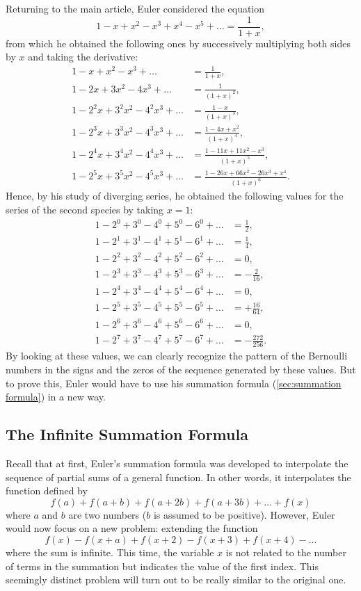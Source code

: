 Returning to the main article, Euler considered the equation
$$1 - x + x^2 - x^3 + x^4 - x^5 + \dots = \frac{1}{1+x},$$
from which he obtained the following ones by successively multiplying both sides by $x$ and taking the derivative:
\begin{align*}
    1 - x + x^2 - x^3 + \dots &= \frac{1}{1+x}, \\
    1 - 2x + 3x^2 - 4x^3 + \dots &= \frac{1}{(1+x)^2}, \\
    1 - 2^2x + 3^2x^2 - 4^2x^3 + \dots &= \frac{1-x}{(1+x)^3}, \\
    1 - 2^3x + 3^3x^2 - 4^3x^3 + \dots &= \frac{1-4x + x^2}{(1+x)^4}, \\
    1 - 2^4x + 3^4x^2 - 4^4x^3 + \dots &= \frac{1 - 11x + 11x^2 - x^3}{(1+x)^5}, \\
    1 - 2^5x + 3^5x^2 - 4^5x^3 + \dots &= \frac{1 - 26x + 66x^2 - 26x^3 + x^4}{(1+x)^6}.
\end{align*}
Hence, by his study of diverging series, he obtained the following values for the series of the second species by taking $x = 1$:
\begin{align*}
    1 - 2^0 + 3^0 - 4^0 + 5^0 - 6^0 + \dots &= \frac{1}{2}, \\
    1 - 2^1 + 3^1 - 4^1 + 5^1 - 6^1 + \dots &= \frac{1}{4}, \\
    1 - 2^2 + 3^2 - 4^2 + 5^2 - 6^2 + \dots &= 0, \\
    1 - 2^3 + 3^3 - 4^3 + 5^3 - 6^3 + \dots &= -\frac{2}{16}, \\
    1 - 2^4 + 3^4 - 4^4 + 5^4 - 6^4 + \dots &= 0, \\
    1 - 2^5 + 3^5 - 4^5 + 5^5 - 6^5 + \dots &= +\frac{16}{64}, \\
    1 - 2^6 + 3^6 - 4^6 + 5^6 - 6^6 + \dots &= 0, \\
    1 - 2^7 + 3^7 - 4^7 + 5^7 - 6^7 + \dots &= -\frac{272}{256}.
\end{align*}
By looking at these values, we can clearly recognize the pattern of the Bernoulli numbers in the signs and the zeros of the sequence generated by these values. But to prove this, Euler would have to use his summation formula (\autoref{sec:summation formula}) in a new way.

\subsection*{The Infinite Summation Formula}

Recall that at first, Euler's summation formula was developed to interpolate the sequence of partial sums of a general function. In other words, it interpolates the function defined by
$$f(a) + f(a + b) + f(a + 2b) + f(a + 3b) + \dots + f(x)$$
where $a$ and $b$ are two numbers ($b$ is assumed to be positive). However, Euler would now focus on a new problem: extending the function
$$f(x) - f(x + a) + f(x + 2) - f(x + 3) + f(x + 4) - \dots$$
where the sum is infinite. This time, the variable $x$ is not related to the number of terms in the summation but indicates the value of the first index. This seemingly distinct problem will turn out to be really similar to the original one.

